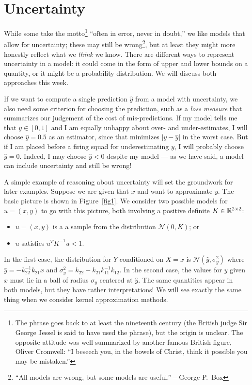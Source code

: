 \documentclass[12pt, leqno]{article} %
\begin{document}
\section{Uncertainty}

While some take the motto\footnote{%
  The phrase goes back to at least the nineteenth century (the British
  judge Sir George Jessel is said to have used the phrase), but the
  origin is unclear.  The opposite attitude was well summarized by
  another famous British figure, Oliver Cromwell: ``I beseech you, in
  the bowels of Christ, think it possible you may be mistaken.''
}
``often in error, never in doubt,''
we like models that allow for uncertainty; these may still be
wrong\footnote{%
  ``All models are wrong, but some models are useful.'' -- George P.~Box
},
but at least they might more honestly reflect what we {\em think}
we know.  There are different ways to represent uncertainty in a
model: it could come in the form of upper and lower bounds on
a quantity, or it might be a probability distribution.  We will
discuss both approaches this week.

If we want to compute a single prediction $\hat{y}$ from a model with
uncertainty, we also need some criterion for choosing the prediction,
such as a {\em loss measure} that summarizes our judgement of the cost
of mis-predictions.  If my model tells me that $y \in [0,1]$ and I am
equally unhappy about over- and under-estimates, I will choose
$\hat{y} = 0.5$ as an estimator, since that minimizes $|y-\hat{y}|$ in
the worst case.  But if I am placed before a firing squad for
underestimating $y$, I will probably choose $\hat{y} = 0$.  Indeed, I
may choose $\hat{y} < 0$ despite my model --- as we have said, a model
can include uncertainty and still be wrong!

A simple example of reasoning about uncertainty will set the
groundwork for later examples.  Suppose we are given that $x$
and want to approximate $y$.  The basic picture is shown in
Figure~\ref{fig1}.  We consider two possible models
for $u = (x,y)$ to go with this picture, both involving a positive definite
$K \in \mathbb{R}^{2 \times 2}$:
\begin{itemize}
  \item $u = (x,y)$ is a a sample from the distribution $\mathcal{N}(0,K)$; or
  \item $u$ satisfies $u^T K^{-1} u < 1$.
\end{itemize}
In the first case, the distribution for $Y$ conditioned on $X = x$
is $\mathcal{N}(\hat{y}, \sigma_y^2)$ where
$\hat{y} = -k_{22}^{-1} k_{21} x$ and
$\sigma_y^2 = k_{22} - k_{21} k_{11}^{-1} k_{12}$.  In the second
case, the values for $y$ given $x$ must lie in a ball of radius
$\sigma_y$ centered at $\hat{y}$.  The same quantities appear in both
models, but they have rather interpretations!  We will see exactly
the same thing when we consider kernel approximation methods.
\end{document}
